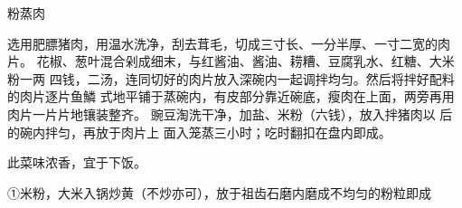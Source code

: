 \begin{recipe}{粉蒸肉}

\ingredients


\cooking

\step 选用肥膘猪肉，用温水洗净，刮去茸毛，切成三寸长、一分半厚、一寸二宽的肉片。
\step 花椒、葱叶混合剁成细末，与红酱油、酱油、耢糟、豆腐乳水、红糖、大米粉一两
四钱，二汤，连同切好的肉片放入深碗内一起调拌均匀。然后将拌好配料的肉片逐片鱼鱗
式地平铺于蒸碗内，有皮部分靠近碗底，瘦肉在上面，两旁再用肉片一片片地镶装整齐。
\step 豌豆淘洗干净，加盐、米粉（六钱），放入拌猪肉以 后的碗内拌匀，再放于肉片上
面入笼蒸三小时；吃时翻扣在盘内即成。

\notes

此菜味浓香，宜于下饭。

①米粉，大米入锅炒黄（不炒亦可），放于祖齿石磨内磨成不均匀的粉粒即成

\end{recipe}

